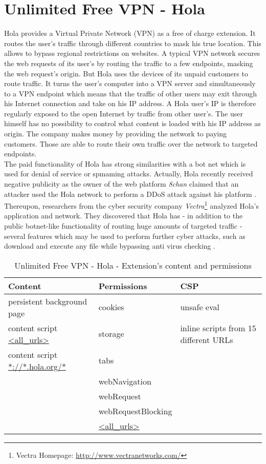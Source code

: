 \section{Unlimited Free VPN - Hola}
	Hola provides a Virtual Private Network (VPN) as a free of charge extension. It routes the user's traffic through different countries to mask his true location. This allows to bypass regional restrictions on websites. A typical VPN network secures the web requests of its user's by routing the traffic to a few endpoints, masking the web request's origin. But Hola uses the devices of its unpaid customers to route traffic. It turns the user's computer into a VPN server and simultaneously to a VPN endpoint which means that the traffic of other users may exit through his Internet connection and take on his IP address. A Hola user's IP is therefore regularly exposed to the open Internet by traffic from other user's. The user himself has no possibility to control what content is loaded with his IP address as origin. The company makes money by providing the network to paying customers. Those are able to route their own traffic over the network to targeted endpoints. \\
	
	The paid functionality of Hola has strong similarities with a bot net which is used for denial of service or spmaming attacks. Actually, Hola recently received negative publicity as the owner of the web platform \textit{8chan} claimed that an attacker used the Hola network to perform a DDoS attack against his platform \cite{8chanHola}. Thereupon, researchers from the cyber security company \textit{Vectra}\footnote{Vectra Homepage: \url{http://www.vectranetworks.com/}} analyzed Hola's application and network. They discovered that Hola has - in addition to the public botnet-like functionality of routing huge amounts of targeted traffic - several features which may be used to perform further cyber attacks, such as download and execute any file while bypassing anti virus checking \cite{vectraHola}. \\ 


	
	\begin{table}[h]
		\centering
		\begin{tabular}{|l|l|l|} \hline
			\textbf{Content} & \textbf{Permissions} & \textbf{CSP} \\ \hline
			persistent background page & cookies & unsafe eval\\
			content script  \url{<all_urls>} & storage & inline scripts from 15 different URLs \\
			content script \url{*://*.hola.org/*} & tabs & \\ 
			& webNavigation & \\ 
			& webRequest & \\ 
			& webRequestBlocking & \\ 
			& \url{<all_urls>} & \\ \hline
		\end{tabular}
		\caption{Unlimited Free VPN - Hola - Extension's content and permissions}
	\end{table}
	
